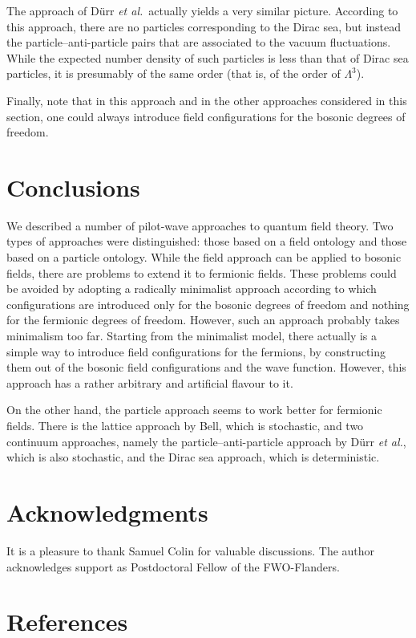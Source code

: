 \documentclass[11pt]{article}
\begin{document}
The approach of D\"urr {\em  et al.}\ actually yields a very similar picture. According to this approach, there are no particles corresponding to the Dirac sea, but instead the particle--anti-particle pairs that are associated to the vacuum fluctuations. While the expected number density of such particles is less than that of Dirac sea particles, it is presumably of the same order (that is, of the order of $\Lambda^3$).

Finally, note that in this approach and in the other approaches considered in this section, one could always introduce field configurations for the bosonic degrees of freedom. 


\section{Conclusions}
We described a number of pilot-wave approaches to quantum field theory. Two types of approaches were distinguished: those based on a field ontology and those based on a particle ontology. While the field approach can be applied to bosonic fields, there are problems to extend it to fermionic fields. These problems could be avoided by adopting a radically minimalist approach according to which configurations are introduced only for the bosonic degrees of freedom and nothing for the fermionic degrees of freedom. However, such an approach probably takes minimalism too far. Starting from the minimalist model, there actually is a simple way to introduce field configurations for the fermions, by constructing them out of the bosonic field configurations and the wave function. However, this approach has a rather arbitrary and artificial flavour to it. 

On the other hand, the particle approach seems to work better for fermionic fields. There is the lattice approach by Bell, which is stochastic, and two continuum approaches, namely the particle--anti-particle approach by D\"urr {\em et al.}, which is also stochastic, and the Dirac sea approach, which is deterministic. 



\section*{Acknowledgments}
It is a pleasure to thank Samuel Colin for valuable discussions. The author acknowledges support as Postdoctoral Fellow of the FWO-Flanders.

\section*{References}
\end{document}
